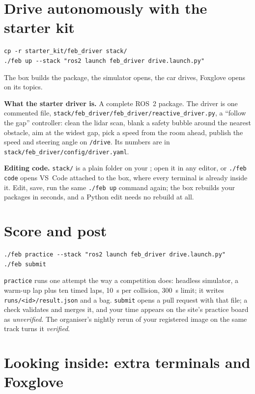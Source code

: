 \section{Drive autonomously with the starter kit}

\begin{lstlisting}
cp -r starter_kit/feb_driver stack/
./feb up --stack "ros2 launch feb_driver drive.launch.py"
\end{lstlisting}

The box builds the package, the simulator opens, the car drives, Foxglove opens on its topics.

\textbf{What the starter driver is.} A complete ROS~2 package. The driver is one commented file,
\texttt{stack/feb\_driver/feb\_driver/reactive\_driver.py}, a ``follow the gap'' controller: clean
the lidar scan, blank a safety bubble around the nearest obstacle, aim at the widest gap, pick a
speed from the room ahead, publish the speed and steering angle on \texttt{/drive}. Its numbers are in
\texttt{stack/feb\_driver/config/driver.yaml}.

\textbf{Editing code.} \texttt{stack/} is a plain folder on your \OSname; open it in any editor, or
\texttt{./feb code} opens VS~Code attached to the box, where every terminal is already inside it.
Edit, save, run the same \texttt{./feb up} command again; the box rebuilds your packages in
seconds, and a Python edit needs no rebuild at all.

\section{Score and post}

\begin{lstlisting}
./feb practice --stack "ros2 launch feb_driver drive.launch.py"
./feb submit
\end{lstlisting}

\texttt{practice} runs one attempt the way a competition does: headless simulator, a warm-up lap
plus ten timed laps, 10~s per collision, 300~s limit; it writes \texttt{runs/<id>/result.json} and a
bag. \texttt{submit} opens a pull request with that file; a check validates and merges it, and your
time appears on the site's practice board as \emph{unverified}. The organiser's nightly rerun of your
registered image on the same track turns it \emph{verified}.

\section{Looking inside: extra terminals and Foxglove}


